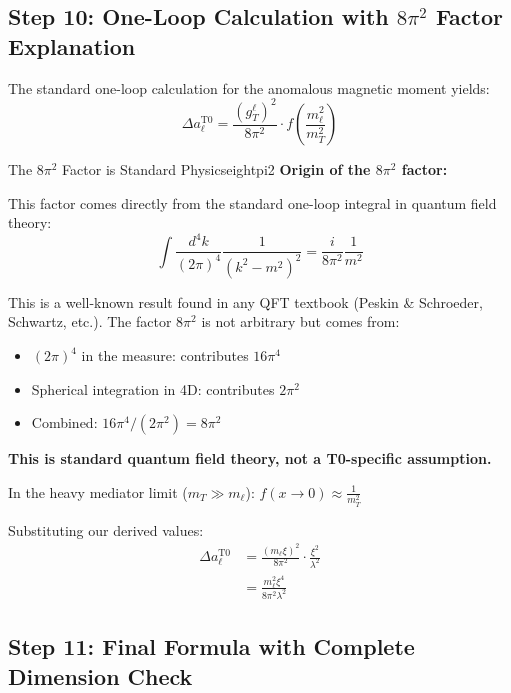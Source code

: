 \documentclass[12pt,a4paper]{article}
\begin{document}
	\subsection{Step 10: One-Loop Calculation with $8\pi^2$ Factor Explanation}
	
	The standard one-loop calculation for the anomalous magnetic moment yields:
	\begin{equation}
		\Delta a_\ell^{\text{T0}} = \frac{(g_T^\ell)^2}{8\pi^2} \cdot f\left(\frac{m_\ell^2}{m_T^2}\right)
		\label{eq:oneloop_general}
	\end{equation}
	
	\begin{criticism}{The $8\pi^2$ Factor is Standard Physics}{eightpi2}
		\textbf{Origin of the $8\pi^2$ factor:}
		
		This factor comes directly from the standard one-loop integral in quantum field theory:
		\begin{equation}
			\int \frac{d^4k}{(2\pi)^4} \frac{1}{(k^2 - m^2)^2} = \frac{i}{8\pi^2} \frac{1}{m^2}
		\end{equation}
		
		This is a well-known result found in any QFT textbook (Peskin \& Schroeder, Schwartz, etc.). The factor $8\pi^2$ is not arbitrary but comes from:
		\begin{itemize}
			\item $(2\pi)^4$ in the measure: contributes $16\pi^4$
			\item Spherical integration in 4D: contributes $2\pi^2$  
			\item Combined: $16\pi^4/(2\pi^2) = 8\pi^2$
		\end{itemize}
		
		\textbf{This is standard quantum field theory, not a T0-specific assumption.}
	\end{criticism}
	
	In the heavy mediator limit ($m_T \gg m_\ell$): $f(x \to 0) \approx \frac{1}{m_T^2}$
	
	Substituting our derived values:
	\begin{align}
		\Delta a_\ell^{\text{T0}} &= \frac{(m_\ell \xi)^2}{8\pi^2} \cdot \frac{\xi^2}{\lambda^2} \\
		&= \frac{m_\ell^2 \xi^4}{8\pi^2 \lambda^2}
		\label{eq:anomaly_intermediate}
	\end{align}
	
	\subsection{Step 11: Final Formula with Complete Dimension Check}
	
\end{document}
